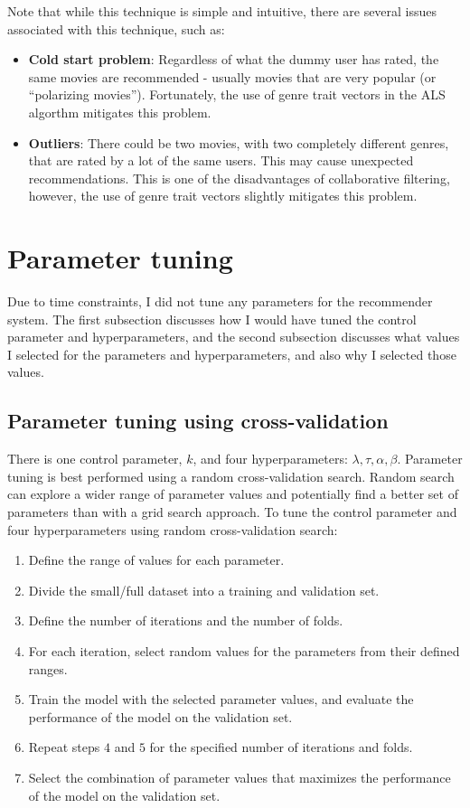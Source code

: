 \documentclass{article}
\begin{document}
Note that while this technique is simple and intuitive, there are several issues associated with this technique, such as:
\begin{itemize}
    \item \textbf{Cold start problem}: Regardless of what the dummy user has rated, the same movies are recommended - usually movies that are very popular (or ``polarizing movies'').
    Fortunately, the use of genre trait vectors in the ALS algorthm mitigates this problem.
    \item \textbf{Outliers}: There could be two movies, with two completely different genres, that are rated by a lot of the same users. This may cause
    unexpected recommendations. This is one of the disadvantages of collaborative filtering, however, the use of genre trait vectors slightly mitigates this problem.
\end{itemize}

\newpage

\section{Parameter tuning}
Due to time constraints, I did not tune any parameters for the recommender system.
The first subsection discusses how I would have tuned the control parameter and hyperparameters, 
and the second subsection discusses what values I selected for the parameters and hyperparameters, 
and also why I selected those values.

\subsection{Parameter tuning using cross-validation}
There is one control parameter, $k$, and four hyperparameters: $\lambda, \tau, \alpha, \beta$.
Parameter tuning is best performed using a random cross-validation search.
Random search can explore a wider range of parameter values and potentially find 
a better set of parameters than with a grid search approach.
To tune the control parameter and four hyperparameters using random cross-validation search:
\begin{enumerate}
    \item Define the range of values for each parameter.
    \item Divide the small/full dataset into a training and validation set.
    \item Define the number of iterations and the number of folds.
    \item For each iteration, select random values for the parameters from their defined ranges.
    \item Train the model with the selected parameter values, and evaluate the performance of the model on the validation set.
    \item Repeat steps $4$ and $5$ for the specified number of iterations and folds.
    \item Select the combination of parameter values that maximizes the performance of the model on the validation set.
\end{enumerate}
\end{document}
